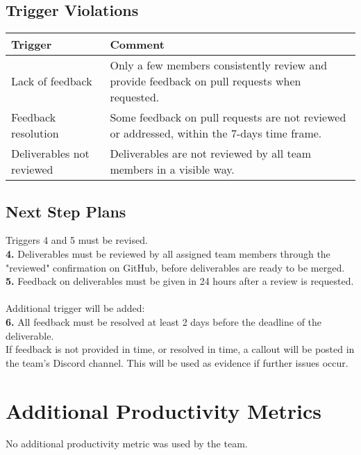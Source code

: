 \documentclass{article}
\begin{document}
\subsection{Trigger Violations}
\begin{table}[H]
\centering
\begin{tabular}{p{3cm} p{10cm}}
\toprule
\textbf{Trigger} & \textbf{Comment}\\
\midrule
Lack of feedback & Only a few members consistently review and provide feedback on pull requests when requested.\\
Feedback resolution & Some feedback on pull requests are not reviewed or addressed, within the 7-days time frame.\\
Deliverables not reviewed & Deliverables are not reviewed by all team members in a visible way.\\
\bottomrule
\end{tabular}
\end{table}

\subsection{Next Step Plans}
Triggers 4 and 5 must be revised. \\
\textbf{4.} Deliverables must be reviewed by all assigned team members through the "reviewed" confirmation on GitHub, before deliverables are ready to be merged. \\
\textbf{5.} Feedback on deliverables must be given in 24 hours after a review is requested. 
\\\\
Additional trigger will be added:\\
\textbf{6.} All feedback must be resolved at least 2 days before the deadline of the deliverable.\\
If feedback is not provided in time, or resolved in time, a callout will be posted in the team's Discord channel. This will be used as evidence if further issues occur.
\section{Additional Productivity Metrics}
No additional productivity metric was used by the team.
\end{document}
